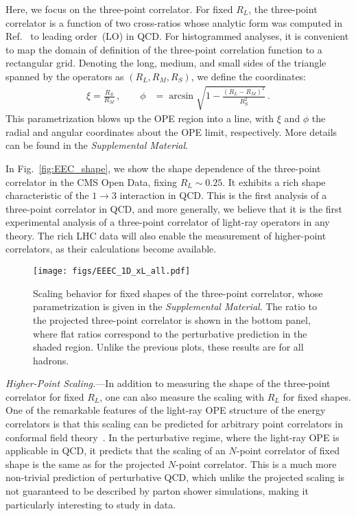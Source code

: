 \documentclass[aps,prl,twocolumn,showpacs,10pt,superscriptaddress,preprintnumbers,nofootinbib,longbibliography]{revtex4-1}
\DeclareRobustCommand{\Fig}[1]{Fig.~\ref{#1}}
\begin{document}
Here, we focus on the three-point correlator.
%
For fixed $R_L$, the three-point correlator is a function of two cross-ratios whose analytic form was computed in Ref.~\cite{Chen:2019bpb} to leading order~(LO) in QCD.
%
For histogrammed analyses, it is convenient to map the domain of definition of the three-point correlation function to a rectangular grid.
%
Denoting the long, medium, and small sides of the triangle spanned by the operators as $(R_L, R_M, R_S)$, we define the coordinates:
\begin{align}
\xi=\frac{R_S}{R_M} \,, \qquad \phi&=\arcsin \sqrt{1 - \frac{(R_L-R_M)^2}{R_S^2}}
\,.
\label{eq:transf}
\end{align}
%
This parametrization blows up the OPE region into a line, with $\xi$ and $\phi$ the radial and angular coordinates about the OPE limit, respectively.
%
More details can be found in the \emph{Supplemental Material}. 


In \Fig{fig:EEC_shape}, we show the shape dependence of the three-point correlator in the CMS Open Data, fixing $R_L \sim 0.25$.
%
It exhibits a rich shape characteristic of the $1\to 3$ interaction in QCD.
%
This is the first analysis of a three-point correlator in QCD, and more generally, we believe that it is the first experimental analysis of a three-point correlator of light-ray operators in any theory.
%
The rich LHC data will also enable the measurement of higher-point correlators, as their calculations become available.


\begin{figure}[t]
\texttt{[image: figs/EEEC\_1D\_xL\_all.pdf]}
\caption{Scaling behavior for fixed shapes of the three-point correlator, whose parametrization is given in the \emph{Supplemental Material}. The ratio to the projected three-point correlator is shown in the bottom panel, where flat ratios correspond to the perturbative prediction in the shaded region.  Unlike the previous plots, these results are for all hadrons.}
\label{fig:EEC_shape_scale}
\end{figure}



\emph{Higher-Point Scaling.}---In addition to measuring the shape of the three-point correlator for fixed $R_L$, one can also measure the scaling with $R_L$ for fixed shapes.
%
One of the remarkable features of the light-ray OPE structure of the energy correlators is that this scaling can be predicted for arbitrary point correlators in conformal field theory~\cite{Hofman:2008ar}.
%
In the perturbative regime, where the light-ray OPE is applicable in QCD, it predicts that the scaling of an $N$-point correlator of fixed shape is the same as for the projected $N$-point correlator.
%
This is a much more non-trivial prediction of perturbative QCD, which unlike the projected scaling is not guaranteed to be described by parton shower simulations, making it particularly interesting to study in data. 
\end{document}

